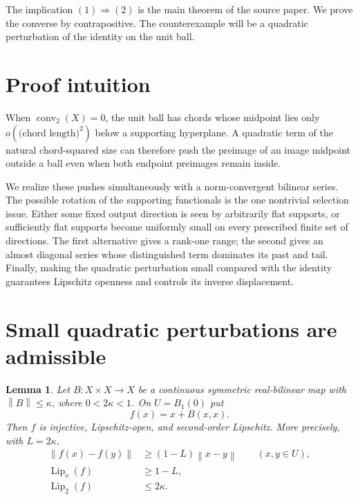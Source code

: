 \documentclass[11pt]{article}
\newtheorem{lemma}[theorem]{Lemma}
\newcommand{\norm}[1]{\left\lVert #1\right\rVert}
\begin{document}
The implication $(1)\Rightarrow(2)$ is the main theorem of the source
paper.  We prove the converse by contrapositive.  The counterexample will be
a quadratic perturbation of the identity on the unit ball.

\section{Proof intuition}

When $\operatorname{conv}_2(X)=0$, the unit ball has chords whose midpoint
lies only $o(\bigl(\text{chord length}\bigr)^2)$ below a supporting
hyperplane.  A quadratic term of the natural chord-squared size can therefore
push the preimage of an image midpoint outside a ball even when both endpoint
preimages remain inside.

We realize these pushes simultaneously with a norm-convergent bilinear
series.  The possible rotation of the supporting functionals is the one
nontrivial selection issue.  Either some fixed output direction is seen by
arbitrarily flat supports, or sufficiently flat supports become uniformly
small on every prescribed finite set of directions.  The first alternative
gives a rank-one range; the second gives an almost diagonal series whose
distinguished term dominates its past and tail.  Finally, making the
quadratic perturbation small compared with the identity guarantees
Lipschitz openness and controls its inverse displacement.

\section{Small quadratic perturbations are admissible}

\begin{lemma}\label{lem:quadratic}
Let $B:X\times X\to X$ be a continuous symmetric real-bilinear map with
$\norm{B}\leq\kappa$, where $0<2\kappa<1$.  On $U=B_1(0)$ put
\[
                     f(x)=x+B(x,x).
\]
Then $f$ is injective, Lipschitz-open, and second-order Lipschitz.  More
precisely, with $L=2\kappa$,
\begin{align}
 \norm{f(x)-f(y)}&\geq(1-L)\norm{x-y} \qquad(x,y\in U),\label{eq:lower}\\
 \operatorname{Lip}_o(f)&\geq1-L,\label{eq:open}\\
 \operatorname{Lip}_2(f)&\leq2\kappa.\label{eq:lip2}
\end{align}
\end{lemma}
\end{document}
